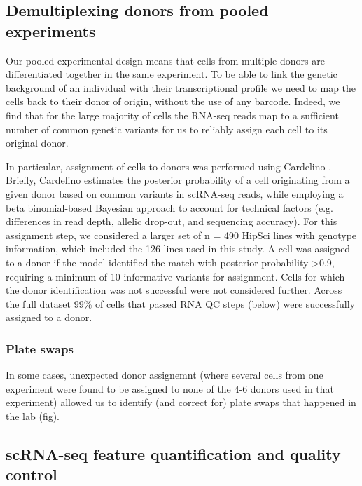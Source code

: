 \subsection{Demultiplexing donors from pooled experiments} 

Our pooled experimental design means that cells from multiple donors are differentiated together in the same experiment. 
To be able to link the genetic background of an individual with their transcriptional profile we need to map the cells back to their donor of origin, without the use of any barcode.
Indeed, we find that for the large majority of cells the RNA-seq reads map to a sufficient number of common genetic variants for us to reliably assign each cell to its original donor.

In particular, assignment of cells to donors was performed using Cardelino \cite{mccarthy2020cardelino}. 
Briefly, Cardelino estimates the posterior probability of a cell originating from a given donor based on common variants in scRNA-seq reads, while employing a beta binomial-based Bayesian approach to account for technical factors (e.g. differences in read depth, allelic drop-out, and sequencing accuracy). 
For this assignment step, we considered a larger set of n = 490 HipSci lines with genotype information, which included the 126 lines used in this study. 
A cell was assigned to a donor if the model identified the match with posterior probability >0.9, requiring a minimum of 10 informative variants for assignment. 
Cells for which the donor identification was not successful were not considered further.
Across the full dataset 99\% of cells that passed RNA QC steps (below) were successfully assigned to a donor.

\subsubsection{Plate swaps}

In some cases, unexpected donor assignemnt (where several cells from one experiment were found to be assigned to none of the 4-6 donors used in that experiment) allowed us to identify (and correct for) plate swaps that happened in the lab (fig).

\subsection{scRNA-seq feature quantification and quality control}

